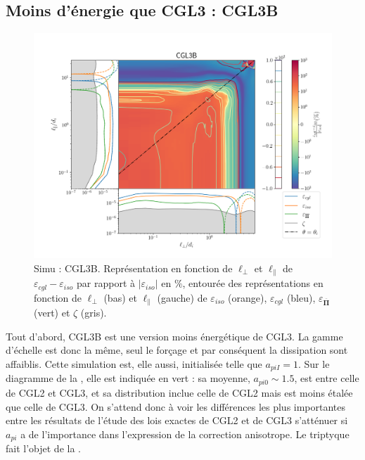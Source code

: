  \subsection{Moins d'énergie que CGL3 : CGL3B}
 \begin{figure}[!ht]
  \centering
  \includegraphics[width=0.95\linewidth,trim=1cm 1cm 0cm 2cm, clip=true]{./Mainmatter/Part_3/images_ch3/CGL3B_panel_isocgl_percent}
 \cprotect\caption{Simu : CGL3B. Représentation  en fonction de \ensuremath{\ell_{\perp}} et \ensuremath{\ell_{\parallel}} de \ensuremath{\varepsilon_{cgl}-\varepsilon_{iso}} par rapport à \ensuremath{|\varepsilon_{iso}|} en \ensuremath{\%}, entourée des représentations  en fonction de \ensuremath{\ell_{\perp}} (bas) et \ensuremath{\ell_{\parallel}} (gauche) de \ensuremath{\varepsilon_{iso}} (orange), \ensuremath{\varepsilon_{cgl}} (bleu), \ensuremath{\varepsilon_{\overline{\boldsymbol{\Pi}}}} (vert) et \ensuremath{\zeta} (gris). }
 \label{fig:trip_CGL3B}
 \end{figure}
 Tout d'abord, CGL3B est une version moins énergétique de CGL3. La gamme d'échelle est donc la même, seul le forçage et par conséquent la dissipation sont affaiblis. Cette simulation est, elle aussi, initialisée telle que $a_{piI} = 1$. Sur le diagramme de la , elle est indiquée en vert : sa moyenne, $a_{pi0} \sim 1.5$,  est entre celle de CGL2 et CGL3, et sa distribution inclue celle de CGL2 mais est moins étalée que celle de CGL3. On s'attend donc à voir les différences les plus importantes entre les résultats de l'étude des lois exactes de CGL2 et de CGL3 s'atténuer si $a_{pi}$ a de l'importance dans l'expression de la correction anisotrope.  Le triptyque fait l'objet de la . %
 
